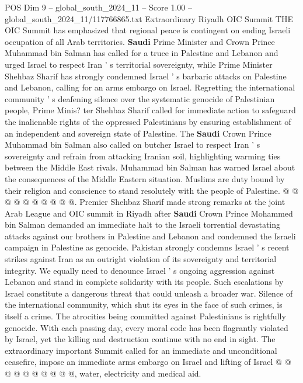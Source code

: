 \begin{textsample}{POS Dim 9 – global\_south\_2024\_11 – Score 1.00 – global\_south\_2024\_11/117766865.txt}  \label{ex:f9_pos_033}
Extraordinary Riyadh OIC Summit THE OIC Summit has emphasized that regional peace is contingent on ending Israeli occupation of all Arab territories. \textbf{Saudi} Prime Minister and Crown Prince Muhammad bin Salman has called for a truce in Palestine and Lebanon and urged Israel to respect Iran ' s territorial sovereignty, while Prime Minister Shehbaz Sharif has strongly condemned Israel ' s barbaric attacks on Palestine and Lebanon, calling for an arms embargo on Israel.
Regretting the international community ' s deafening silence over the systematic genocide of Palestinian people, Prime Minis? ter Shehbaz Sharif called for immediate action to safeguard the inalienable rights of the oppressed Palestinians by ensuring establishment of an independent and sovereign state of Palestine.
The \textbf{Saudi} Crown Prince Muhammad bin Salman also called on butcher Israel to respect Iran ' s sovereignty and refrain from attacking Iranian soil, highlighting warming ties between the Middle East rivals.
Muhammad bin Salman has warned Israel about the consequences of the Middle Eastern situation.
Muslims are duty bound by their religion and conscience to stand resolutely with the people of Palestine. @ @ @ @ @ @ @ @ @ @.
Premier Shehbaz Sharif made strong remarks at the joint Arab League and OIC summit in Riyadh after \textbf{Saudi} Crown Prince Mohammed bin Salman demanded an immediate halt to the Israeli torrential devastating attacks against our brothers in Palestine and Lebanon and condemned the Israeli campaign in Palestine as genocide.
Pakistan strongly condemns Israel ' s recent strikes against Iran as an outright violation of its sovereignty and territorial integrity.
We equally need to denounce Israel ' s ongoing aggression against Lebanon and stand in complete solidarity with its people.
Such escalations by Israel constitute a dangerous threat that could unleash a broader war.
Silence of the international community, which shut its eyes in the face of such crimes, is itself a crime.
The atrocities being committed against Palestinians is rightfully genocide.
With each passing day, every moral code has been flagrantly violated by Israel, yet the killing and destruction continue with no end in sight.
The extraordinary important Summit called for an immediate and unconditional ceasefire, impose an immediate arms embargo on Israel and lifting of Israel @ @ @ @ @ @ @ @ @ @, water, electricity and medical aid.

\end{textsample}
